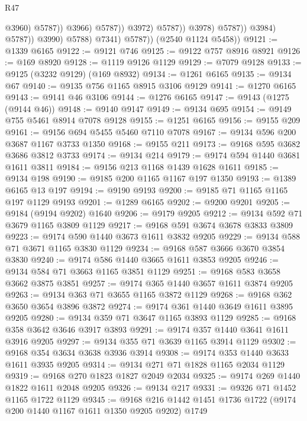 \begin{lexlean}{R47}
\begin{coremodule}
                                              @3960)
                                            @5787))
                                        @3966)
                                      @5787))
                                  @3972)
                                @5787))
                            @3978)
                          @5787))
                      @3984)
                    @5787))
                @3990)
              @5788)
            @7341)
          @5787))
      (@2540 @1124 @5458))
@9121 := @1339 @6165
@9122 := @9121 @746
@9125 := @9122 @757 @8916 @8921
@9126 := @169 @8920
@9128 := @1119 @9126 @1129
@9129 := @7079 @9128
@9133 := @9125 (@3232 @9129) (@169 @8932)
@9134 := @1261 @6165
@9135 := @9134 @67
@9140 := @9135 @756 @1165 @8915 @3106 @9129
@9141 := @1270 @6165
@9143 := @9141 @46 @3106
@9144 := @1276 @6165
@9147 := @9143 (@1275 (@9144 @46))
@9148 := @9140 @9147
@9149 := @9134 @695
@9154 := @9149 @755 @5461 @8914 @7078 @9128
@9155 := @1251 @6165
@9156 := @9155 @209
@9161 := @9156 @694 @5455 @5460 @7110 @7078
@9167 := @9134 @596 @200 @3687 @1167 @3733 @1350
@9168 := @9155 @211
@9173 := @9168 @595 @3682 @3686 @3812 @3733
@9174 := @9134 @214
@9179 := @9174 @594 @1440 @3681 @1611 @3811
@9184 := @9156 @213 @1168 @1439 @1628 @1611
@9185 := @9134 @198
@9190 := @9185 @200 @1165 @1167 @197 @1350
@9193 := @1389 @6165 @13 @197
@9194 := @9190 @9193
@9200 := @9185 @71 @1165 @1165 @197 @1129 @9193
@9201 := @1289 @6165
@9202 := @9200 @9201
@9205 := @9184 (@9194 @9202) @1640
@9206 := @9179 @9205
@9212 := @9134 @592 @71 @3679 @1165 @3809 @1129
@9217 := @9168 @591 @3674 @3678 @3833 @3809
@9223 := @9174 @590 @1440 @3673 @1611 @3832 @9205
@9229 := @9134 @588 @71 @3671 @1165 @3830 @1129
@9234 := @9168 @587 @3666 @3670 @3854 @3830
@9240 := @9174 @586 @1440 @3665 @1611 @3853 @9205
@9246 := @9134 @584 @71 @3663 @1165 @3851 @1129
@9251 := @9168 @583 @3658 @3662 @3875 @3851
@9257 := @9174 @365 @1440 @3657 @1611 @3874 @9205
@9263 := @9134 @363 @71 @3655 @1165 @3872 @1129
@9268 := @9168 @362 @3650 @3654 @3896 @3872
@9274 := @9174 @361 @1440 @3649 @1611 @3895 @9205
@9280 := @9134 @359 @71 @3647 @1165 @3893 @1129
@9285 := @9168 @358 @3642 @3646 @3917 @3893
@9291 := @9174 @357 @1440 @3641 @1611 @3916 @9205
@9297 := @9134 @355 @71 @3639 @1165 @3914 @1129
@9302 := @9168 @354 @3634 @3638 @3936 @3914
@9308 := @9174 @353 @1440 @3633 @1611 @3935 @9205
@9314 := @9134 @271 @71 @1828 @1165 @2034 @1129
@9319 := @9168 @270 @1823 @1827 @2049 @2034
@9325 := @9174 @269 @1440 @1822 @1611 @2048 @9205
@9326 := @9134 @217
@9331 := @9326 @71 @1452 @1165 @1722 @1129
@9345 := @9168 @216 @1442 @1451 @1736 @1722 (@9174 @200 @1440 @1167 @1611 @1350 @9205 @9202) @1749

\end{coremodule}
\end{lexlean}
